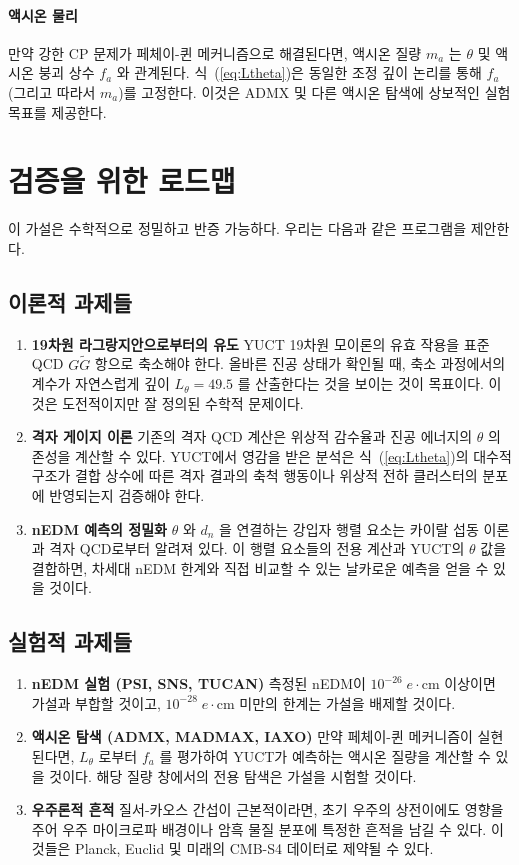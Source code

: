 \documentclass[11pt,a4paper]{article}
\begin{document}
	\paragraph{액시온 물리}
	만약 강한 CP 문제가 페체이-퀸 메커니즘으로 해결된다면, 액시온 질량 \(m_a\) 는 \(\theta\) 및 액시온 붕괴 상수 \(f_a\) 와 관계된다. 식~(\ref{eq:Ltheta})은 동일한 조정 깊이 논리를 통해 \(f_a\)(그리고 따라서 \(m_a\))를 고정한다. 이것은 ADMX 및 다른 액시온 탐색에 상보적인 실험 목표를 제공한다.
	
	\section{검증을 위한 로드맵}
	\label{sec:roadmap}
	
	이 가설은 수학적으로 정밀하고 반증 가능하다. 우리는 다음과 같은 프로그램을 제안한다.
	
	\subsection{이론적 과제들}
	\begin{enumerate}
		\item \textbf{19차원 라그랑지안으로부터의 유도} YUCT 19차원 모이론의 유효 작용을 표준 QCD \(G\widetilde{G}\) 항으로 축소해야 한다. 올바른 진공 상태가 확인될 때, 축소 과정에서의 계수가 자연스럽게 깊이 \(L_\theta = 49.5\) 를 산출한다는 것을 보이는 것이 목표이다. 이것은 도전적이지만 잘 정의된 수학적 문제이다.
		\item \textbf{격자 게이지 이론} 기존의 격자 QCD 계산은 위상적 감수율과 진공 에너지의 \(\theta\) 의존성을 계산할 수 있다. YUCT에서 영감을 받은 분석은 식~(\ref{eq:Ltheta})의 대수적 구조가 결합 상수에 따른 격자 결과의 축척 행동이나 위상적 전하 클러스터의 분포에 반영되는지 검증해야 한다.
		\item \textbf{nEDM 예측의 정밀화} \(\theta\) 와 \(d_n\) 을 연결하는 강입자 행렬 요소는 카이랄 섭동 이론과 격자 QCD로부터 알려져 있다. 이 행렬 요소들의 전용 계산과 YUCT의 \(\theta\) 값을 결합하면, 차세대 nEDM 한계와 직접 비교할 수 있는 날카로운 예측을 얻을 수 있을 것이다.
	\end{enumerate}
	
	\subsection{실험적 과제들}
	\begin{enumerate}
		\item \textbf{nEDM 실험 (PSI, SNS, TUCAN)} 측정된 nEDM이 \(10^{-26}\;e\!\cdot\!\mathrm{cm}\) 이상이면 가설과 부합할 것이고, \(10^{-28}\;e\!\cdot\!\mathrm{cm}\) 미만의 한계는 가설을 배제할 것이다.
		\item \textbf{액시온 탐색 (ADMX, MADMAX, IAXO)} 만약 페체이-퀸 메커니즘이 실현된다면, \(L_\theta\) 로부터 \(f_a\) 를 평가하여 YUCT가 예측하는 액시온 질량을 계산할 수 있을 것이다. 해당 질량 창에서의 전용 탐색은 가설을 시험할 것이다.
		\item \textbf{우주론적 흔적} 질서-카오스 간섭이 근본적이라면, 초기 우주의 상전이에도 영향을 주어 우주 마이크로파 배경이나 암흑 물질 분포에 특정한 흔적을 남길 수 있다. 이것들은 Planck, Euclid 및 미래의 CMB-S4 데이터로 제약될 수 있다.
	\end{enumerate}
	
\end{document}

